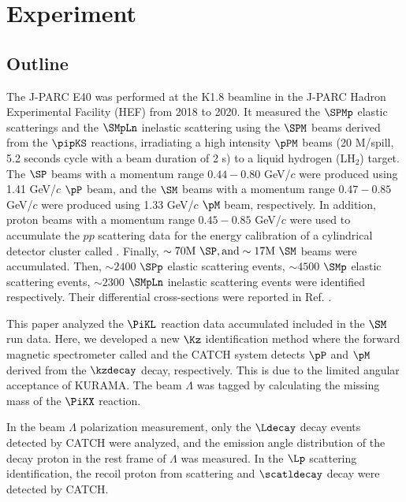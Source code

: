 %
\graphicspath{{./pictures/chapter2/}}

\chapter{Experiment} 
\label{chap-exp}

\section{Outline}
The J-PARC E40 was performed at the K1.8 beamline in the J-PARC Hadron Experimental Facility (HEF) from 2018 to 2020. It measured the $\SPMp$ elastic scatterings and the $\SMpLn$ inelastic scattering using the $\SPM$ beams derived from the $\pipKS$ reactions, irradiating a high intensity $\pPM$ beams (20 M/spill, 5.2 seconds cycle with a beam duration of 2 s) to a liquid hydrogen (LH$_2$) target. The $\SP$ beams with a momentum range $0.44-0.80$ GeV/$c$ were produced using 1.41 GeV/$c$ $\pP$ beam, and the $\SM$ beams with a momentum range $0.47-0.85$ GeV/$c$ were produced using 1.33 GeV/$c$ $\pM$ beam, respectively. In addition, proton beams with a momentum range $0.45-0.85$ GeV/$c$ were used to accumulate the $pp$ scattering data for the energy calibration of a cylindrical detector cluster called  \cite{Aka-2020}. Finally, $\sim70 \rm{M}\ \SP, and \sim17 \rm{M}\ \SM$ beams were accumulated. Then,  $\sim2400$ $\SPp$ elastic scattering events, $\sim4500$ $\SMp$ elastic scattering events, $\sim2300$ $\SMpLn$ inelastic scattering events were identified respectively. Their differential cross-sections were reported in Ref. \cite{Nana-SPp, Miwa-SMp, Miwa-SMLn}.

This paper analyzed the $\PiKL$ reaction data accumulated included in the $\SM$ run data. Here, we developed a new $\Kz$ identification method where the forward magnetic spectrometer called  and the CATCH system detects $\pP$ and $\pM$ derived from the $\kzdecay$ decay, respectively. This is due to the limited angular acceptance of KURAMA. The beam $\Lambda$ was tagged by calculating the missing mass of the $\PiKX$ reaction. 

In the beam $\Lambda$ polarization measurement, only the $\Ldecay$ decay events detected by CATCH were analyzed, and the emission angle distribution of the decay proton in the rest frame of $\Lambda$ was measured. In the $\Lp$ scattering identification, the recoil proton from scattering and $\scatldecay$ decay were detected by CATCH. 



